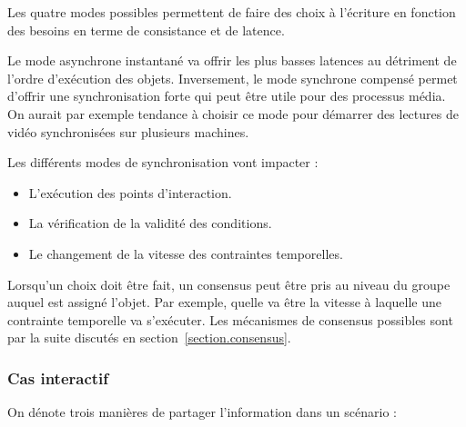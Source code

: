 \documentclass[10pt]{article}
\newcommand\triggers{points d'interaction\xspace}
\begin{document}
Les quatre modes possibles permettent de faire des choix à l'écriture en fonction des besoins en terme de consistance et de latence.

Le mode asynchrone instantané va offrir les plus basses latences au détriment de l'ordre d'exécution des objets.
Inversement, le mode synchrone compensé permet d'offrir une synchronisation forte qui peut être utile pour des processus média. 
On aurait par exemple tendance à choisir ce mode pour démarrer des lectures de vidéo synchronisées sur plusieurs machines.

Les différents modes de synchronisation vont impacter : 
\begin{itemize}
    \item L'exécution des \triggers.
    \item La vérification de la validité des conditions.
    \item Le changement de la vitesse des contraintes temporelles.
\end{itemize}

Lorsqu'un choix doit être fait, un consensus peut être pris au niveau du groupe auquel est assigné l'objet. 
Par exemple, quelle va être la vitesse à laquelle une contrainte temporelle va s'exécuter.
Les mécanismes de consensus possibles sont par la suite discutés en section~\ref{section.consensus}.

\subsubsection{Cas interactif}
On dénote trois manières de partager l'information dans un scénario : 
\end{document}
